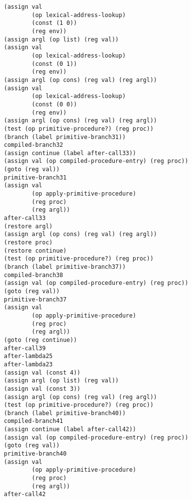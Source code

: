 \documentclass[a4paper,12pt]{article}
\begin{document}
\begin{lstlisting}
(assign val
        (op lexical-address-lookup)
        (const (1 0))
        (reg env))
(assign argl (op list) (reg val))
(assign val
        (op lexical-address-lookup)
        (const (0 1))
        (reg env))
(assign argl (op cons) (reg val) (reg argl))
(assign val
        (op lexical-address-lookup)
        (const (0 0))
        (reg env))
(assign argl (op cons) (reg val) (reg argl))
(test (op primitive-procedure?) (reg proc))
(branch (label primitive-branch31))
compiled-branch32
(assign continue (label after-call33))
(assign val (op compiled-procedure-entry) (reg proc))
(goto (reg val))
primitive-branch31
(assign val
        (op apply-primitive-procedure)
        (reg proc)
        (reg argl))
after-call33
(restore argl)
(assign argl (op cons) (reg val) (reg argl))
(restore proc)
(restore continue)
(test (op primitive-procedure?) (reg proc))
(branch (label primitive-branch37))
compiled-branch38
(assign val (op compiled-procedure-entry) (reg proc))
(goto (reg val))
primitive-branch37
(assign val
        (op apply-primitive-procedure)
        (reg proc)
        (reg argl))
(goto (reg continue))
after-call39
after-lambda25
after-lambda23
(assign val (const 4))
(assign argl (op list) (reg val))
(assign val (const 3))
(assign argl (op cons) (reg val) (reg argl))
(test (op primitive-procedure?) (reg proc))
(branch (label primitive-branch40))
compiled-branch41
(assign continue (label after-call42))
(assign val (op compiled-procedure-entry) (reg proc))
(goto (reg val))
primitive-branch40
(assign val
        (op apply-primitive-procedure)
        (reg proc)
        (reg argl))
after-call42
\end{lstlisting}
\end{document}
